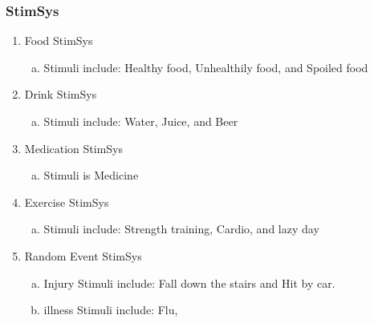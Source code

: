 \documentclass[]{article}
\begin{document}
\subsubsection{StimSys}
\begin{enumerate}[1)]
	\item Food StimSys
		\begin{enumerate}[a)]
			\item Stimuli include: Healthy food, Unhealthily food, and Spoiled food
		\end{enumerate}
	\item Drink StimSys
		\begin{enumerate}[a)]
			\item Stimuli include: Water, Juice, and Beer
		\end{enumerate}
	\item Medication StimSys
		\begin{enumerate}[a)]
			\item Stimuli is Medicine
		\end{enumerate}
	\item Exercise StimSys
		\begin{enumerate}[a)]
			\item Stimuli include: Strength training, Cardio, and lazy day
		\end{enumerate}
	\item Random Event StimSys
		\begin{enumerate}[a)]
			\item Injury Stimuli include: Fall down the stairs and Hit by car.
			\item illness Stimuli include: Flu,
		\end{enumerate}
\end{enumerate}
\end{document}
